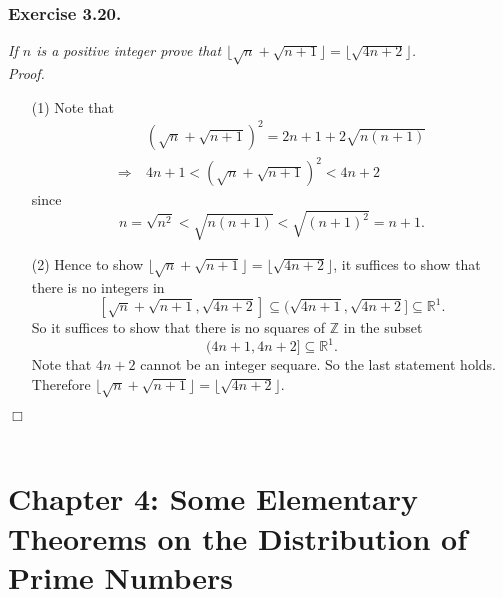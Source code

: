 \documentclass{article}
\begin{document}



\subsubsection*{Exercise 3.20.}
\emph{If $n$ is a positive integer prove that
$\lfloor \sqrt{n} + \sqrt{n+1} \rfloor = \lfloor \sqrt{4n+2} \rfloor$.} \\



\emph{Proof.}
\begin{enumerate}
\item[(1)]
  Note that
  \begin{align*}
    &\: (\sqrt{n} + \sqrt{n+1})^2 = 2n+1 + 2 \sqrt{n(n+1)} \\
    \Longrightarrow &\:
    4n+1 < (\sqrt{n} + \sqrt{n+1})^2 < 4n+2
  \end{align*}
  since
  \[
    n = \sqrt{n^2} < \sqrt{n(n+1)} < \sqrt{(n+1)^2} = n+1.
  \]

\item[(2)]
  Hence to show $\lfloor \sqrt{n} + \sqrt{n+1} \rfloor = \lfloor \sqrt{4n+2} \rfloor$,
  it suffices to show that there is no integers in
  \[
    [\sqrt{n} + \sqrt{n+1}, \sqrt{4n+2}]
    \subseteq (\sqrt{4n+1}, \sqrt{4n+2}]
    \subseteq \mathbb{R}^1.
  \]
  So it suffices to show that there is no squares of $\mathbb{Z}$ in the subset
  \[
    (4n+1, 4n+2] \subseteq \mathbb{R}^1.
  \]
  Note that $4n+2$ cannot be an integer sequare.
  So the last statement holds.
  Therefore $\lfloor \sqrt{n} + \sqrt{n+1} \rfloor = \lfloor \sqrt{4n+2} \rfloor$.
\end{enumerate}
$\Box$ \\\\









\newpage
\section*{Chapter 4: Some Elementary Theorems on the Distribution of Prime Numbers \\}
\end{document}
